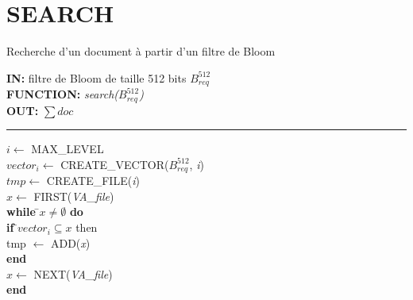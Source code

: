 \newpage
\section{SEARCH}
\begin{algorithme}
	Recherche d'un document à partir d'un filtre de Bloom
\end{algorithme}

\begin{flushleft}
	\begin{framed}
		\textbf{IN:} filtre de Bloom de taille 512 bits $B^{512}_{req}$\\
		\textbf{FUNCTION:} \textit{search($B^{512}_{req}$)}\\
		\textbf{OUT:} \textit{$\sum doc$}\\

		\noindent\rule{\linewidth}{0.5pt}

		\begin{tabbing}
			$i \leftarrow$ MAX\_LEVEL\\
			$vector_i \leftarrow$ CREATE\_VECTOR($B^{512}_{req}$, \textit{i})\\
			$tmp \leftarrow$ CREATE\_FILE(\textit{i})\\
			$x \leftarrow$ FIRST(\textit{VA\_file})\\
			
			\textbf{while }\=$x \neq \emptyset $ \textbf{do}\\
					\> \textbf{if }\=$vector_i \subseteq x$ {then}\\
						\>\> tmp $\leftarrow$ ADD(\textit{x})\\
					\> \textbf{end}\\
					\> $x \leftarrow$ NEXT(\textit{VA\_file})\\
			\textbf{end}\\
			

\end{tabbing}
\end{framed}
\end{flushleft}
